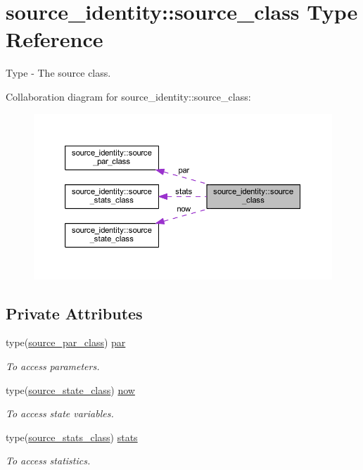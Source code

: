\hypertarget{structsource__identity_1_1source__class}{}\section{source\+\_\+identity\+:\+:source\+\_\+class Type Reference}
\label{structsource__identity_1_1source__class}


Type -\/ The source class.  




Collaboration diagram for source\+\_\+identity\+:\+:source\+\_\+class\+:\nopagebreak
\begin{figure}[H]
\begin{center}
\leavevmode
\includegraphics[width=350pt]{structsource__identity_1_1source__class__coll__graph}
\end{center}
\end{figure}
\subsection*{Private Attributes}
\begin{DoxyCompactItemize}
\item 
type(\mbox{\hyperlink{structsource__identity_1_1source__par__class}{source\+\_\+par\+\_\+class}}) \mbox{\hyperlink{structsource__identity_1_1source__class_a76f6ab0f23f1bd6de588620fb9e83052}{par}}
\begin{DoxyCompactList}\small\item\em To access parameters. \end{DoxyCompactList}\item 
type(\mbox{\hyperlink{structsource__identity_1_1source__state__class}{source\+\_\+state\+\_\+class}}) \mbox{\hyperlink{structsource__identity_1_1source__class_a65677d8e36c2044c771cc9340e76fbec}{now}}
\begin{DoxyCompactList}\small\item\em To access state variables. \end{DoxyCompactList}\item 
type(\mbox{\hyperlink{structsource__identity_1_1source__stats__class}{source\+\_\+stats\+\_\+class}}) \mbox{\hyperlink{structsource__identity_1_1source__class_ad90346f6a339f45fc7e563733444c5d8}{stats}}
\begin{DoxyCompactList}\small\item\em To access statistics. \end{DoxyCompactList}\end{DoxyCompactItemize}


